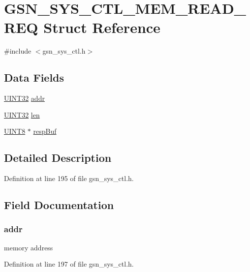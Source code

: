 \hypertarget{a00250}{
\section{GSN\_\-SYS\_\-CTL\_\-MEM\_\-READ\_\-REQ Struct Reference}
\label{a00250}
}


{\ttfamily \#include $<$gsn\_\-sys\_\-ctl.h$>$}

\subsection*{Data Fields}
\begin{DoxyCompactItemize}
\item 
\hyperlink{a00660_gae1e6edbbc26d6fbc71a90190d0266018}{UINT32} \hyperlink{a00250_a211571ed47a0fee2d898236395234dab}{addr}
\item 
\hyperlink{a00660_gae1e6edbbc26d6fbc71a90190d0266018}{UINT32} \hyperlink{a00250_ab9abc6ede61238a05664f9c37e4412c3}{len}
\item 
\hyperlink{a00660_gab27e9918b538ce9d8ca692479b375b6a}{UINT8} $\ast$ \hyperlink{a00250_a2290ebad3b4d5d62d0d60f961557d3bb}{respBuf}
\end{DoxyCompactItemize}


\subsection{Detailed Description}


Definition at line 195 of file gsn\_\-sys\_\-ctl.h.



\subsection{Field Documentation}
\hypertarget{a00250_a211571ed47a0fee2d898236395234dab}{
\subsubsection[{addr}]{ {\bf addr}}}
\label{a00250_a211571ed47a0fee2d898236395234dab}
memory address 

Definition at line 197 of file gsn\_\-sys\_\-ctl.h.

